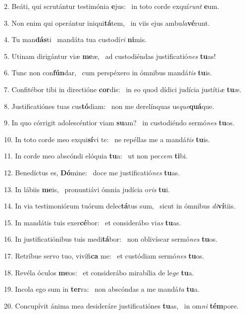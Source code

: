 2. Beáti, qui scrutántur testimónia \textbf{e}jus: \ast\  in toto corde exquí\textit{runt} \textbf{e}um.\

3. Non enim qui operántur iniqui\textbf{tá}tem, \ast\  in viis ejus ambu\textit{la}\textbf{vé}runt.\

4. Tu man\textbf{dás}ti \ast\  mandáta tua custodí\textit{ri} \textbf{ni}mis.\

5. Utinam dirigántur viæ \textbf{me}æ, \ast\  ad custodiéndas justificatió\textit{nes} \textbf{tu}as!\

6. Tunc non con\textbf{fún}dar, \ast\  cum perspéxero in ómnibus mandá\textit{tis} \textbf{tu}is.\

7. Confitébor tibi in directióne \textbf{cor}dis: \ast\  in eo quod dídici judícia justíti\textit{æ} \textbf{tu}æ.\

8. Justificatiónes tuas cus\textbf{tó}diam: \ast\  non me derelínquas us\textit{que}\textbf{quá}que.\

9. In quo córrigit adolescéntior viam \textbf{su}am? \ast\  in custodiéndo sermó\textit{nes} \textbf{tu}os.\

10. In toto corde meo exqui\textbf{sí}vi te: \ast\  ne repéllas me a mandá\textit{tis} \textbf{tu}is.\

11. In corde meo abscóndi elóquia \textbf{tu}a: \ast\  ut non pec\textit{cem} \textbf{ti}bi.\

12. Benedíctus es, \textbf{Dó}mine: \ast\  doce me justificatió\textit{nes} \textbf{tu}as.\

13. In lábiis \textbf{me}is, \ast\  pronuntiávi ómnia judícia o\textit{ris} \textbf{tu}i.\

14. In via testimoniórum tuórum delec\textbf{tá}tus sum, \ast\  sicut in ómnibus \textit{di}\textbf{ví}tiis.\

15. In mandátis tuis exer\textbf{cé}bor: \ast\  et considerábo vi\textit{as} \textbf{tu}as.\

16. In justificatiónibus tuis medi\textbf{tá}bor: \ast\  non oblivíscar sermó\textit{nes} \textbf{tu}os.\

17. Retríbue servo tuo, vivífi\textbf{ca} me: \ast\  et custódiam sermó\textit{nes} \textbf{tu}os.\

18. Revéla óculos \textbf{me}os: \ast\  et considerábo mirabília de le\textit{ge} \textbf{tu}a.\

19. Incola ego sum in \textbf{ter}ra: \ast\  non abscóndas a me mandá\textit{ta} \textbf{tu}a.\

20. Concupívit ánima mea desideráre justificatiónes \textbf{tu}as, \ast\  in om\textit{ni} \textbf{tém}pore.\


